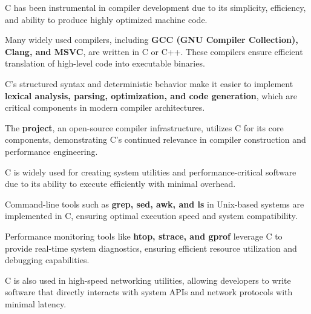 \begin{NxSSSSBox}
	\begin{NxIDBox}
		C has been instrumental in compiler development due to its simplicity, efficiency, and ability to produce highly optimized machine code.
	\end{NxIDBox}
	\begin{NxIDBox}
		Many widely used compilers, including \textbf{GCC (GNU Compiler Collection), Clang, and MSVC}, are written in C or C++. These compilers ensure efficient translation of high-level code into executable binaries.
	\end{NxIDBox}
	\begin{NxIDBox}
		C’s structured syntax and deterministic behavior make it easier to implement \textbf{lexical analysis, parsing, optimization, and code generation}, which are critical components in modern compiler architectures.
	\end{NxIDBox}
	\begin{NxIDBox}
		The \textbf{ project}, an open-source compiler infrastructure, utilizes C for its core components, demonstrating C’s continued relevance in compiler construction and performance engineering.
	\end{NxIDBox}
\end{NxSSSSBox}

\begin{NxSSSSBox}
	\begin{NxIDBox}
		C is widely used for creating system utilities and performance-critical software due to its ability to execute efficiently with minimal overhead.
	\end{NxIDBox}
	\begin{NxIDBox}
		Command-line tools such as \textbf{grep, sed, awk, and ls} in Unix-based systems are implemented in C, ensuring optimal execution speed and system compatibility.
	\end{NxIDBox}
	\begin{NxIDBox}
		Performance monitoring tools like \textbf{htop, strace, and gprof} leverage C to provide real-time system diagnostics, ensuring efficient resource utilization and debugging capabilities.
	\end{NxIDBox}
	\begin{NxIDBox}
		C is also used in high-speed networking utilities, allowing developers to write software that directly interacts with system APIs and network protocols with minimal latency.
	\end{NxIDBox}
\end{NxSSSSBox}

